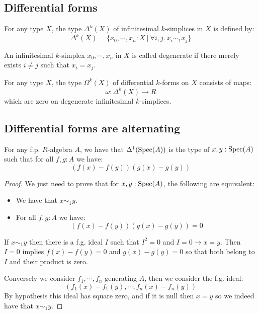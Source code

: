 \subsection{Differential forms}

\begin{definition}
For any type $X$, the type $\Delta^k(X)$ of infinitesimal $k$-simplices in $X$ is defined by:
\[\Delta^k(X) = \{x_0,\cdots,x_n:X\ 
|\ \forall i,j.\ x_i\sim_1x_j\}\]
\end{definition}

\begin{definition}
An infinitesimal $k$-simplex $x_0,\cdots,x_n$ in $X$ is called degenerate if there merely exists $i\not= j$ such that $x_i=x_j$. 
\end{definition}

\begin{definition}
For any type $X$, the type $\Omega^k(X)$ of differential $k$-forms on $X$ consists of maps:
\[\omega:\Delta^k(X)\to R\]
which are zero on degenerate infinitesimal $k$-simplices.
\end{definition}

\subsection{Differential forms are alternating}

\begin{lemma}
For any f.p. $R$-algebra $A$, we have that $\Delta^1(\operatorname{Spec}(A))$ is the type of $x,y:\operatorname{Spec}(A)$ such that for all $f,g:A$ we have:
\[(f(x)-f(y))(g(x)-g(y))\]
\end{lemma}

\begin{proof}
We just need to prove that for $x,y:\operatorname{Spec}(A)$, the following are equivalent:
\begin{itemize}
\item We have that $x\sim_1y$.
\item For all $f,g:A$ we have:
\[(f(x)-f(y))(g(x)-g(y)) = 0\]
\end{itemize}
If $x\sim_1y$ then there is a f.g. ideal $I$ such that $I^2=0$ and $I=0\to x=y$. Then $I=0$ implies $f(x)-f(y)=0$ and $g(x)-g(y)=0$ so that both belong to $I$ and their product is zero.

Conversely we consider $f_1,\cdots,f_n$ generating $A$, then we consider the f.g. ideal:
\[(f_1(x)-f_1(y),\cdots,f_n(x)-f_n(y))\]
By hypothesis this ideal has square zero, and if it is null then $x=y$ so we indeed have that $x\sim_1y$. 
\end{proof}

